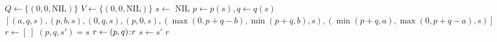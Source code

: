 \documentclass[b5paper]{article}
\begin{document}
\begin{algorithmic}[1]
  \State $Q \gets \{(0, 0, \text{NIL})\}$  
  \State $V \gets \{(0, 0, \text{NIL})\}$  
    \State $s \gets$ 
      \State \Return {}
    \Else
          \State {}
          \State {}
        \EndIf
      \EndFor
    \EndIf
  \EndWhile
  \State \Return NIL
\EndFunction
\Statex
{}
  \State $p \gets p(s), q \gets q(s)$
  \State \Return $[(a, q, s), (p, b, s), (0, q, s), (p, 0, s), (\max(0, p + q - b), \min(p + q, b), s), (\min(p + q, a), \max(0, p + q - a), s)]$
\EndFunction
\Statex
{}
  \State $r \gets [\ ]$
    \State $(p, q, s') = s$
    \State $r \gets (p, q) \mathbin{\!:\!} r$
    \State $s \gets s'$
  \EndWhile
  \State \Return $r$
\EndFunction
\end{algorithmic}

\begin{Exercise}\label{ex:water-jugs-puzzle}
\end{Exercise}
\end{document}

